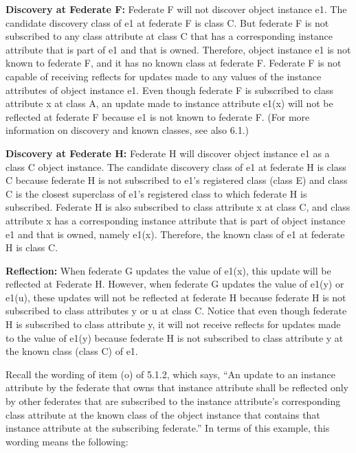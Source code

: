 \begin{annexstdpage}
    \begin{stddashlist}
        \item \textbf{Discovery at Federate F:} Federate F will not discover object instance e1. The candidate discovery class of e1 at federate F is class C. But federate F is not subscribed to any class attribute at class C that has a corresponding instance attribute that is part of e1 and that is owned. Therefore, object instance e1 is not known to federate F, and it has no known class at federate F. Federate F is not capable of receiving reflects for updates made to any values of the instance attributes of object instance e1. Even though federate F is subscribed to class attribute x at class A, an update made to instance attribute e1(x) will not be reflected at federate F because e1 is not known to federate F. (For more information on discovery and known classes, see also 6.1.)
        \item \textbf{Discovery at Federate H:} Federate H will discover object instance e1 as a class C object instance. The candidate discovery class of e1 at federate H is class C because federate H is not subscribed to e1's registered class (class E) and class C is the closest superclass of e1's registered class to which federate H is subscribed. Federate H is also subscribed to class attribute x at class C, and class attribute x has a corresponding instance attribute that is part of object instance e1 and that is owned, namely e1(x). Therefore, the known class of e1 at federate H is class C.
        \item \textbf{Reflection:} When federate G updates the value of e1(x), this update will be reflected at Federate H. However, when federate G updates the value of e1(y) or e1(u), these updates will not be reflected at federate H because federate H is not subscribed to class attributes y or u at class C. Notice that even though federate H is subscribed to class attribute y, it will not receive reflects for updates made to the value of e1(y) because federate H is not subscribed to class attribute y at the known class (class C) of e1.
    \end{stddashlist}

    Recall the wording of item (o) of 5.1.2, which says, ``An update to an instance attribute by the federate that owns that instance attribute shall be reflected only by other federates that are subscribed to the instance attribute's corresponding class attribute at the known class of the object instance that contains that instance attribute at the subscribing federate.'' In terms of this example, this wording means the following:


\end{annexstdpage}
